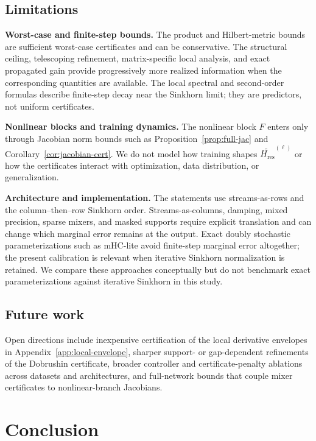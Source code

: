 \documentclass[10pt]{article}
\numberwithin{equation}{section}
\theoremstyle{plain}
\theoremstyle{definition}
\theoremstyle{remark}
\newcommand{\Hres}{H_{\mathrm{res}}}
\begin{document}
\subsection{Limitations}\label{subsec:limitations}

\noindent\textbf{Worst-case and finite-step bounds.}
The product and Hilbert-metric bounds are sufficient worst-case certificates and
can be conservative. The structural ceiling, telescoping refinement,
matrix-specific local analysis, and exact propagated gain provide
progressively more realized information when the corresponding quantities are
available. The local spectral and second-order formulas describe finite-step
decay near the Sinkhorn limit; they are predictors, not uniform certificates.

\noindent\textbf{Nonlinear blocks and training dynamics.}
The nonlinear block $F$ enters only through Jacobian norm bounds such as Proposition~\ref{prop:full-jac} and Corollary~\ref{cor:jacobian-cert}. We do not model how training shapes $\widetilde{\Hres}^{(\ell)}$ or how the certificates interact with optimization, data distribution, or generalization.

\noindent\textbf{Architecture and implementation.}
The statements use streams-as-rows and the column--then--row Sinkhorn order. Streams-as-columns, damping, mixed precision, sparse mixers, and masked supports require explicit translation and can change which marginal error remains at the output.
Exact doubly stochastic parameterizations such as mHC-lite avoid finite-step
marginal error altogether; the present calibration is relevant when iterative
Sinkhorn normalization is retained. We compare these approaches conceptually but
do not benchmark exact parameterizations against iterative Sinkhorn in this study.

\subsection{Future work}\label{subsec:future_work}
Open directions include inexpensive certification of the local derivative
envelopes in Appendix~\ref{app:local-envelope}, sharper support- or gap-dependent
refinements of the Dobrushin certificate, broader controller and
certificate-penalty ablations across datasets and architectures, and
full-network bounds that couple mixer certificates to nonlinear-branch Jacobians.


\section{Conclusion}\label{sec:conclusion}
\end{document}
